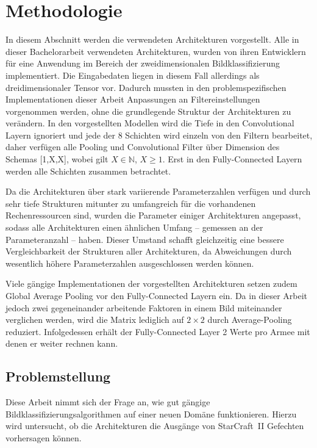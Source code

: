 \section{Methodologie}
\label{Meth}

In diesem Abschnitt werden die verwendeten Architekturen vorgestellt. Alle in dieser Bachelorarbeit verwendeten Architekturen, wurden von ihren Entwicklern für eine Anwendung im Bereich der zweidimensionalen Bildklassifizierung implementiert. Die Eingabedaten liegen in diesem Fall allerdings als dreidimensionaler Tensor vor. Dadurch mussten in den problemspezifischen Implementationen dieser Arbeit Anpassungen an Filtereinstellungen vorgenommen werden, ohne die grundlegende Struktur der Architekturen zu verändern. In den vorgestellten Modellen wird die Tiefe in den Convolutional Layern ignoriert und jede der 8 Schichten wird einzeln von den Filtern bearbeitet, daher verfügen alle Pooling und Convolutional Filter über Dimension des Schemas [1,X,X], wobei gilt $X \in \mathbb{N}$, $X \geq 1$. Erst in den Fully-Connected Layern werden alle Schichten zusammen betrachtet. 

Da die Architekturen über stark variierende Parameterzahlen verfügen und durch sehr tiefe Strukturen mitunter zu umfangreich für die vorhandenen Rechenressourcen sind, wurden die Parameter einiger Architekturen angepasst, sodass alle Architekturen einen ähnlichen Umfang -- gemessen an der Parameteranzahl -- haben. Dieser Umstand schafft gleichzeitig eine bessere Vergleichbarkeit der Strukturen aller Architekturen, da Abweichungen durch wesentlich höhere Parameterzahlen ausgeschlossen werden können. 

Viele gängige Implementationen der vorgestellten Architekturen setzen zudem Global Average Pooling vor den Fully-Connected Layern ein. Da in dieser Arbeit jedoch zwei gegeneinander arbeitende Faktoren in einem Bild miteinander verglichen werden, wird die Matrix lediglich auf $2 \times 2$ durch Average-Pooling reduziert. Infolgedessen erhält der Fully-Connected Layer 2 Werte pro Armee mit denen er weiter rechnen kann. 
 
\subsection{Problemstellung}
Diese Arbeit nimmt sich der Frage an, wie gut gängige Bildklassifizierungsalgorithmen auf einer neuen Domäne funktionieren. Hierzu wird untersucht, ob die Architekturen die Ausgänge von StarCraft~II Gefechten vorhersagen können.

